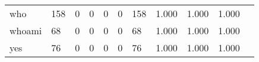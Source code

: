 \begin{longtable}{lp{1.2cm}p{1.2cm}p{1.2cm}p{1.2cm}p{1.2cm}p{1.2cm}p{1.2cm}p{1.2cm}p{1.2cm}p{1.2cm}}
who       &                                   158 &                                                  0 &                                                  0 &                                                  0 &                                                  0 &                                                158 &                                         1.000 &                                              1.000 &                                              1.000 \\
whoami    &                                    68 &                                                  0 &                                                  0 &                                                  0 &                                                  0 &                                                 68 &                                         1.000 &                                              1.000 &                                              1.000 \\
yes       &                                    76 &                                                  0 &                                                  0 &                                                  0 &                                                  0 &                                                 76 &                                         1.000 &                                              1.000 &                                              1.000 \\
\end{longtable}
